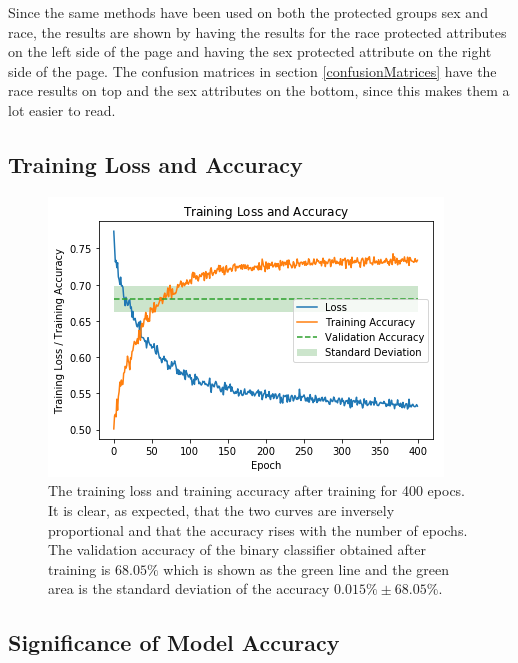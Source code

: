 \documentclass[11pt, fleqn, titlepage]{article}
\begin{document}
	Since the same methods have been used on both the protected groups sex and race, the results are shown by having the results for the race protected attributes on the left side of the page and having the sex protected attribute on the right side of the page. The confusion matrices in section \ref{confusionMatrices} have the race results on top and the sex attributes on the bottom, since this makes them a lot easier to read.
	
	\subsection{Training Loss and Accuracy}\label{training_loss_and_accuracy}
	
	\begin{figure}[H]
			\centering
			\includegraphics[width=0.5\linewidth]{imgs/loss_curve.png}
		\caption{The training loss and training accuracy after training for 400 epocs. It is clear, as expected, that the two curves are inversely proportional and that the accuracy rises with the number of epochs.  The validation accuracy of the binary classifier obtained after training is $ 68.05\%$ which is shown as the green line and the green area is the standard deviation of the accuracy $0.015\% \pm 68.05\%$.%
		}
		\label{fig:losscurve}
	\end{figure}
	
	\subsection{Significance of Model Accuracy}\label{modelAccuracy}
	
\end{document}
